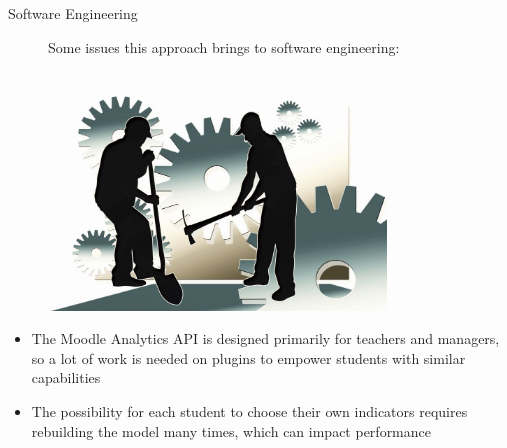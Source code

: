 \begin{frame}{Software Engineering}

    \begin{figure}
        \centering
        \begin{minipage}{.7\textwidth}
            Some issues this approach brings to software engineering:
        \end{minipage}%
        \begin{minipage}{.25\textwidth}
          \centering
          \includegraphics[width=0.8\textwidth]{../../images/work-workers-men.jpg}
        \end{minipage}
    \end{figure}

    \begin{itemize}[<+-|alert@+>]\color{gray}
        \item The Moodle Analytics API is designed primarily for teachers and managers, so a lot of 
              work is needed on plugins to empower students with similar capabilities
        \item The possibility for each student to choose their own indicators requires 
              rebuilding the model many times, which can impact performance
    \end{itemize}
\end{frame}

